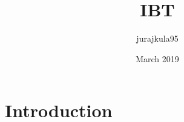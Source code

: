 \documentclass{article}
\title{IBT}
\author{jurajkula95 }
\date{March 2019}
\begin{document}
\maketitle

\section{Introduction}
\end{document}
